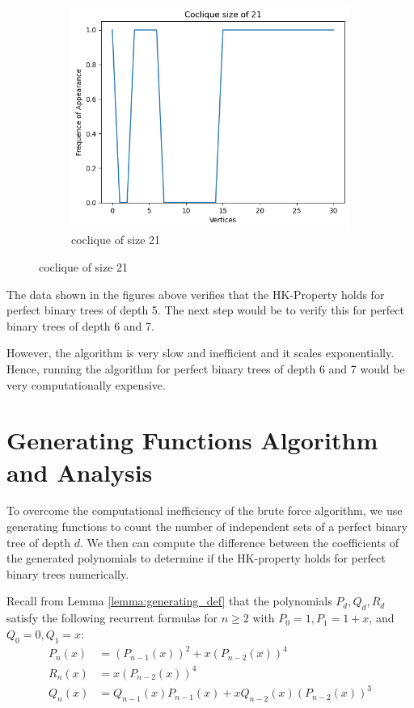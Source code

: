 \documentclass{amsart}
\theoremstyle{definition}
\begin{document}
\begin{appendix}
\begin{figure}[hbt!]
\begin{subfigure}[b]{.45\textwidth}
			\includegraphics[width=1\linewidth]{images/depth_5_size_21.png}
			\caption{coclique of size 21}
		\end{subfigure}
	\end{figure}
	\newpage

	The data shown in the figures above verifies that the HK-Property holds for perfect binary trees of depth 5. The next step would be to verify this for perfect binary trees of depth 6 and 7.

	However, the algorithm is very slow and inefficient and it scales exponentially. Hence, running the algorithm for perfect binary trees of depth 6 and 7 would be very computationally expensive.

	\section{Generating Functions Algorithm and Analysis}\label{generating-functions-algorithm}

	To overcome the computational inefficiency of the brute force algorithm, we use generating functions to count the number of independent sets of a perfect binary tree of depth $d$. We then can compute the difference between the coefficients of the generated polynomials to determine if the HK-property holds for perfect binary trees numerically. 

	Recall from Lemma \ref{lemma:generating_def} that the polynomials $P_d, Q_d, R_d$ satisfy the following recurrent formulas for $n\geq 2$ with $P_{0}=1, P_1=1+x$, and $Q_{0}=0, Q_1=x$:
	\begin{align*}
		P_n(x) &= (P_{n - 1}(x))^2 + x(P_{n - 2}(x))^4  \\
		R_n(x) &= x(P_{n - 2}(x))^4  \\
		Q_n(x) &= Q_{n - 1}(x)P_{n - 1}(x) + xQ_{n - 2}(x)(P_{n - 2}(x))^3
	\end{align*}


\end{appendix}
\end{document}
